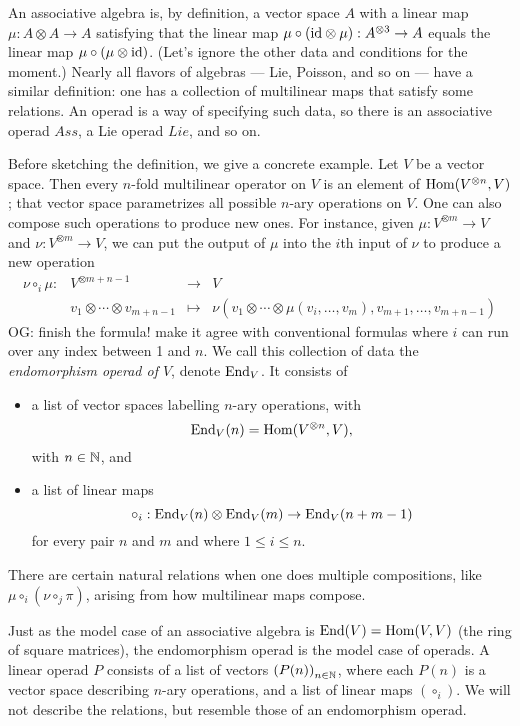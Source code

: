 \documentclass[11pt]{amsart}
\def\owen#1{{\textcolor{violet!50!black}{OG: {#1}}}}
\begin{document}
An associative algebra is, by definition, a vector space $A$ with a linear map $\mu: A\otimes A \to A$ satisfying that the linear map $\mu \circ ({\rm id} \otimes \mu): A^{\otimes 3} \to A$ equals the linear map $\mu \circ (\mu \otimes {\rm id})$.
(Let's ignore the other data and conditions for the moment.)
Nearly all flavors of algebras --- Lie, Poisson, and so on --- have a similar definition:
one has a collection of multilinear maps that satisfy some relations.
An operad is a way of specifying such data, so there is an associative operad $Ass$,
a Lie operad $Lie$, and so on.

Before sketching the definition, we give a concrete example.
Let $V$ be a vector space.
Then every $n$-fold multilinear operator on $V$ is an element of ${\rm Hom}(V^{\otimes n}, V)$;
that vector space parametrizes all possible $n$-ary operations on $V$.
One can also compose such operations to produce new ones.
For instance, given $\mu : V^{\otimes m} \to V$ and $\nu: V^{\otimes m} \to V$, we can put the output of $\mu$ into the $i$th input of $\nu$ to produce a new operation
\[
\begin{array}{cccc}
\nu \circ_i \mu: & V^{\otimes m+n-1} & \to & V\\
& v_1 \otimes \cdots \otimes v_{m+n-1} & \mapsto & \nu(v_1 \otimes \cdots \otimes \mu(v_i, \ldots, v_m), v_{m+1}, \ldots, v_{m+n-1})
\end{array}
\]
\owen{finish the formula! make it agree with conventional formulas}
where $i$ can run over any index between 1 and $n$.
We call this collection of data the {\em endomorphism operad of $V$}, denote ${\rm End}_V$.
It consists of 
\begin{itemize}
\item a list of vector spaces labelling $n$-ary operations, with 
\[
{\rm End}_V(n)= {\rm Hom}(V^{\otimes n}, V),
\]
with $n \in \mathbb N$, and
\item a list of linear maps
\[
\circ_i : {\rm End}_V(n) \otimes {\rm End}_V(m) \to {\rm End}_V(n+m-1)
\]
for every pair $n$ and $m$ and where $1 \leq i \leq n$.
\end{itemize}
There are certain natural relations when one does multiple compositions, like $\mu \circ_i (\nu \circ_j \pi)$, arising from how multilinear maps compose.

Just as the model case of an associative algebra is ${\rm End}(V) = {\rm Hom}(V,V)$ (the ring of square matrices),
the endomorphism operad is the model case of operads.
A linear operad $P$ consists of a list of vectors $\left(P(n) \right)_{n \in \mathbb N}$, where each $P(n)$ is a vector space describing $n$-ary operations, and a list of linear maps $\left(\circ_i\right)$.
We will not describe the relations, but resemble those of an endomorphism operad.
\end{document}
